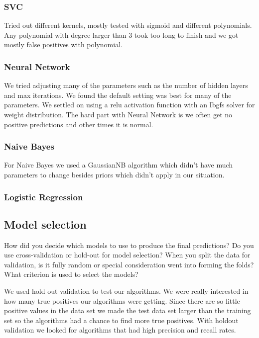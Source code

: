 \documentclass[11pt,a4paper]{article}
\begin{document}
		\subsubsection{SVC}
			Tried out different kernels, mostly tested with sigmoid and different polynomials.
			Any polynomial with degree larger than 3 took too long to finish and we got mostly false positives with polynomial.

		\subsubsection{Neural Network}
			We tried adjusting many of the parameters such as the number of hidden layers and max iterations.
			We found the default setting was best for many of the parameters.
			We settled on using a relu activation function with an Ibgfs solver for weight distribution.
			The hard part with Neural Network is we often get no positive predictions and other times it is normal.

		\subsubsection{Naive Bayes}
			For Naive Bayes we used a GaussianNB algorithm which didn't have much parameters to change besides priors which didn't apply in our situation.

		\subsubsection{Logistic Regression}
			

	\subsection{Model selection}
		How did you decide which models to use to produce the final predictions? 
		Do you use cross-validation or hold-out for model selection?
		When you split the data for validation, is it fully random or special consideration went into forming the folds?
		What criterion is used to select the models?

		We used hold out validation to test our algorithms.
		We were really interested in how many true positives our algorithms were getting.
		Since there are so little positive values in the data set we made the test data set larger than the training set so the algorithms had a chance to find more true positives.
		With holdout validation we looked for algorithms that had high precision and recall rates.
\end{document}
